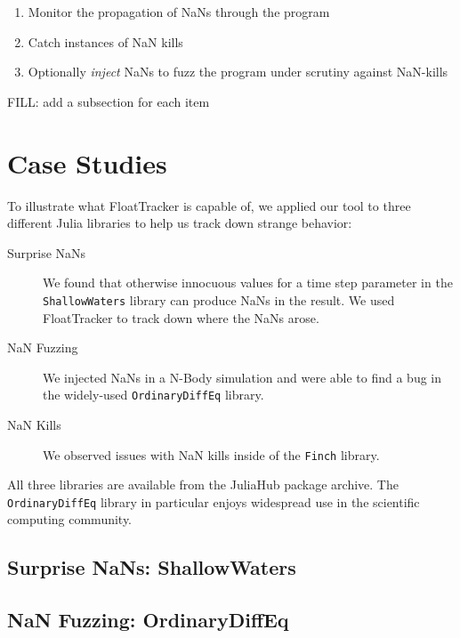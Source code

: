 \documentclass{juliacon}
\begin{document}
\begin{enumerate}
  \item Monitor the propagation of NaNs through the program
  \item Catch instances of NaN kills
  \item Optionally \emph{inject} NaNs to fuzz the program under scrutiny against NaN-kills
\end{enumerate}

FILL: add a subsection for each item

%

\section{Case Studies}

To illustrate what FloatTracker is capable of, we applied our tool to three different Julia libraries to help us track down strange behavior:

\begin{description}
\item[Surprise NaNs] We found that otherwise innocuous values for a time step parameter in the \texttt{ShallowWaters} library can produce NaNs in the result.
  We used FloatTracker to track down where the NaNs arose.
\item[NaN Fuzzing] We injected NaNs in a N-Body simulation and were able to find a bug in the widely-used \texttt{OrdinaryDiffEq} library.
\item[NaN Kills] We observed issues with NaN kills inside of the \texttt{Finch} library.
\end{description}

All three libraries are available from the JuliaHub package archive.
The \texttt{OrdinaryDiffEq} library in particular enjoys widespread use in the scientific computing community.

\subsection{Surprise NaNs: ShallowWaters}

\subsection{NaN Fuzzing: OrdinaryDiffEq}
\end{document}
